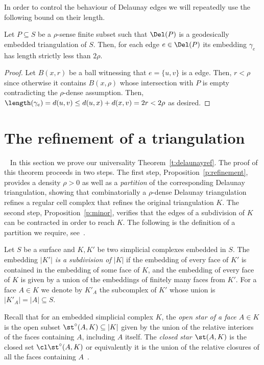 %
In order to control the behaviour of Delaunay edges we will repeatedly use the following bound on their length.
%
\begin{lemma}
  Let $P\subseteq S$ be a $\rho$-sense finite subset such that $\Del(P)$ is a geodesically embedded triangulation of $S$.
  Then, for each edge $e\in \Del(P)$ its embedding $\gamma_e$ has length strictly less than $2\rho$.
\end{lemma}
\begin{proof}
  Let $B(x,r)$ be a ball witnessing that $e=\{u,v\}$ is a edge.
  Then, $r< \rho$ since otherwise it contains $B(x,\rho)$ whose intersection with $P$ is empty contradicting the $\rho$-dense assumption.
  Then, $\length(\gamma_e)=d(u,v)\leq d(u,x)+d(x,v) = 2r < 2\rho$ as desired.
\end{proof}
%
%
%
%
\section{The refinement of a triangulation}
~\label{sec:Universality}
In this section we prove our universality Theorem~\ref{t:delaunayref}.
The proof of this theorem proceeds in two steps.
The first step, Proposition~\ref{p:refinement}, provides a density $\rho>0$ as well as a \emph{partition} of the corresponding Delaunay triangulation,  
showing that combinatorially a $\rho$-dense Delaunay triangulation refines a regular cell complex that refines the original triangulation $K$. 
The second step, Proposition~\ref{p:minor}, verifies that the edges of a subdivision of $K$ can be contracted in order to reach $K$.
The following is the definition of a partition we require, see~\cite[Sect. 15]{munkres84-elements}.
%
\begin{definition}
    Let $S$ be a surface and $K,K'$ be two simplicial complexes embedded in $S$. The embedding \emph{$|K'|$ is a subdivision of $|K|$} if the embedding of every face of $K'$ is contained in the embedding of some face of $K$, and the embedding of every face of $K$ is given by a union of the embeddings of finitely many faces from $K'$.
    For a face $A\in K$ we denote by $K'_A$ the subcomplex of $K'$ whose union is $|K'_A| = |A|\subseteq S$.
\end{definition}
%
Recall that for an embedded simplicial complex $K$, the \emph{open star of a face $A\in K$} is the open subset $\st^\circ(A,K)\subseteq |K|$ given by the union of the relative interiors of the faces containing $A$, including $A$ itself. The \emph{closed star $\st(A,K)$} is the closed set $\cl \st^\circ(A,K)$ or equivalently it is the union of the relative closures of all the faces containing $A$~\cite{munkres84-elements}.
